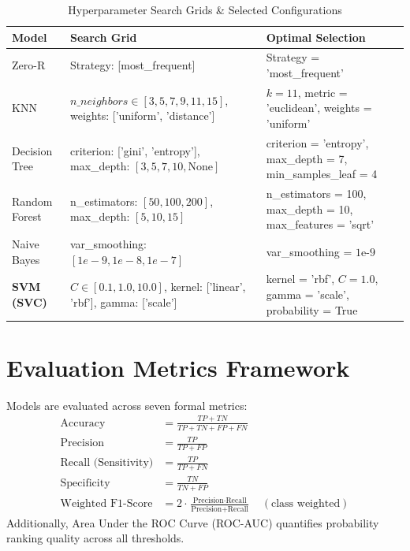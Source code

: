 \begin{table}[H]
\centering
\caption{Hyperparameter Search Grids \& Selected Configurations}
\label{tab:hyperparams}
\small
\begin{tabular}{lll}
\toprule
\textbf{Model} & \textbf{Search Grid} & \textbf{Optimal Selection} \\
\midrule
Zero-R & Strategy: [most\_frequent] & Strategy = 'most\_frequent' \\
KNN & $n\_neighbors \in [3, 5, 7, 9, 11, 15]$, weights: ['uniform', 'distance'] & $k = 11$, metric = 'euclidean', weights = 'uniform' \\
Decision Tree & criterion: ['gini', 'entropy'], max\_depth: $[3, 5, 7, 10, \text{None}]$ & criterion = 'entropy', max\_depth = 7, min\_samples\_leaf = 4 \\
Random Forest & n\_estimators: $[50, 100, 200]$, max\_depth: $[5, 10, 15]$ & n\_estimators = 100, max\_depth = 10, max\_features = 'sqrt' \\
Naive Bayes & var\_smoothing: $[1e-9, 1e-8, 1e-7]$ & var\_smoothing = $1\text{e-}9$ \\
\textbf{SVM (SVC)} & $C \in [0.1, 1.0, 10.0]$, kernel: ['linear', 'rbf'], gamma: ['scale'] & kernel = 'rbf', $C = 1.0$, gamma = 'scale', probability = True \\
\bottomrule
\end{tabular}
\end{table}

\section{Evaluation Metrics Framework}
Models are evaluated across seven formal metrics:
\begin{align}
\text{Accuracy} &= \frac{TP + TN}{TP + TN + FP + FN} \\
\text{Precision} &= \frac{TP}{TP + FP} \\
\text{Recall (Sensitivity)} &= \frac{TP}{TP + FN} \\
\text{Specificity} &= \frac{TN}{TN + FP} \\
\text{Weighted F1-Score} &= 2 \cdot \frac{\text{Precision} \cdot \text{Recall}}{\text{Precision} + \text{Recall}} \quad (\text{class weighted})
\end{align}
Additionally, Area Under the ROC Curve (ROC-AUC) quantifies probability ranking quality across all thresholds.
